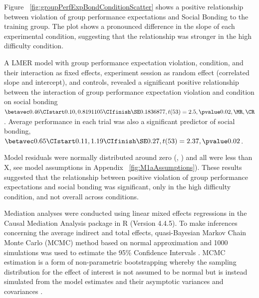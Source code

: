 Figure ~\ref{fig:groupPerfExpBondConditionScatter} shows a positive relationship between violation of group performance expectations and Social Bonding to the training group.  The plot shows a pronounced difference in the slope of each experimental condition, suggesting that the relationship was stronger in the high difficulty condition.

A LMER model with group performance expectation violation, condition, and their interaction as fixed effects, experiment session as random effect (correlated slope and intercept), and controls, revealed a significant positive relationship between the interaction of group performance expectation violation and condition on social bonding $\betavec 0.46 \CIstart 0.10, 0.8191105 \CIfinish \SE 0.1836877, t(53) = 2.5, \pvalue 0.02, \MR , \CR $.  Average performance in each trial was also a significant predictor of social bonding, $\betavec 0.65 \CIstart 0.11, 1.19 \CIfinish \SE 0.27, t(53) = 2.37, \pvalue 0.02$.


Model residuals were normally distributed around zero (, ) and all \cooksD were less than X, see model assumptions in Appendix  ~\ref{fig:M1aAssumptions}).  These results suggested that the relationship between positive violation of group performance expectations and social bonding was significant, only in the high difficulty condition, and not overall across conditions.





Mediation analyses were conducted using linear mixed effects regressions in the Causal Mediation Analysis package in R (Version 4.4.5).  To make inferences concerning the average indirect and total effects, quasi-Bayesian Markov Chain Monte Carlo (MCMC) method based on normal approximation and 1000 simulations was used to estimate the 95\% Confidence Intervals \citep{Tofighi2016a,Imai2010}. MCMC estimation is a form of non-parametric bootstrapping whereby the sampling distribution for the effect of interest is not assumed to be normal but is instead simulated from the model estimates and their asymptotic variances and covariances \cite{Preacher2008}.

